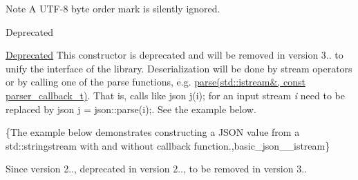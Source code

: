 \begin{DoxyNote}{Note}
A U\+T\+F-\/8 byte order mark is silently ignored.
\end{DoxyNote}
\begin{DoxyRefDesc}{Deprecated}
\item[\hyperlink{deprecated__deprecated000001}{Deprecated}]This constructor is deprecated and will be removed in version 3.. to unify the interface of the library. Deserialization will be done by stream operators or by calling one of the {\ttfamily parse} functions, e.\+g. \hyperlink{classnlohmann_1_1basic__json_a0923f9749409345a21f8cb15ee95fc0d}{parse(std\+::istream\&, const parser\+\_\+callback\+\_\+t)}. That is, calls like {\ttfamily json j(i);} for an input stream {\itshape i} need to be replaced by {\ttfamily json j = json\+::parse(i);}. See the example below.\end{DoxyRefDesc}


\{The example below demonstrates constructing a J\+S\+ON value from a {\ttfamily std\+::stringstream} with and without callback function.,basic\+\_\+json\+\_\+\+\_\+istream\}

\begin{DoxySince}{Since}
version 2.., deprecated in version 2.., to be removed in version 3.. 
\end{DoxySince}
\hypertarget{classnlohmann_1_1basic__json_a4ab93491f82545342562c7ee7e3166c7}{}\label{classnlohmann_1_1basic__json_a4ab93491f82545342562c7ee7e3166c7} 
